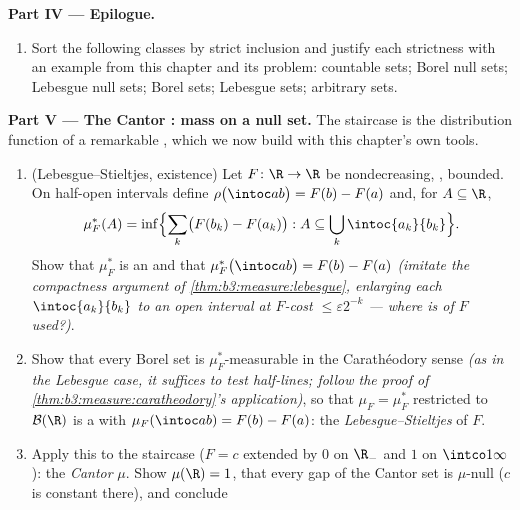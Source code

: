 \begin{problem}
\medskip
\noindent\textbf{Part IV --- Epilogue.}
\begin{enumerate}[resume]
  \item Sort the following classes by strict inclusion and
        justify each strictness with an example from this
        chapter and its problem: countable sets; Borel null
        sets; Lebesgue null sets; Borel sets; Lebesgue sets;
        arbitrary sets.
\end{enumerate}

\medskip
\noindent\textbf{Part V --- The Cantor : mass on a null
set.} The staircase is the distribution function of a
remarkable , which we now build with this chapter's own
tools.
\begin{enumerate}[resume]
  \item (Lebesgue--Stieltjes, existence) Let $F\colon\R\to\R$
        be nondecreasing, , bounded. On half-open
        intervals define $\rho\bigl(\intoc ab\bigr) = F(b) -
        F(a)$ and, for $A \subseteq \R$,
        \[
        \mu_F^*(A) = \inf\Bigl\{\sum_k\bigl(F(b_k) -
        F(a_k)\bigr) : A \subseteq
        \bigcup_k\intoc{a_k}{b_k}\Bigr\} .
        \]
        Show that $\mu_F^*$ is an  and that
        $\mu_F^*\bigl(\intoc ab\bigr) = F(b) - F(a)$
        \emph{(imitate the compactness argument of
        \cref{thm:b3:measure:lebesgue}, enlarging each
        $\intoc{a_k}{b_k}$ to an open interval at
        $F$-cost $\leq \varepsilon2^{-k}$ --- where is
         of $F$ used?)}.
  \item Show that every Borel set is
        $\mu_F^*$-measurable in the Carath\'eodory sense
        \emph{(as in the Lebesgue case, it suffices to test
        half-lines; follow the proof of
        \cref{thm:b3:measure:caratheodory}'s application)}, so
        that $\mu_F = \mu_F^*$ restricted to $\mathcal B(\R)$
        is a  with $\mu_F(\intoc ab) = F(b) - F(a)$:
        the \emph{Lebesgue--Stieltjes } of $F$.
  \item Apply this to the staircase ($F = c$ extended by $0$
        on $\R_-$ and $1$ on $\intco1\infty$): the
        \emph{Cantor } $\mu$. Show $\mu(\R) = 1$, that
        every gap of the Cantor set is $\mu$-null ($c$ is
        constant there), and conclude

\end{enumerate}
\end{problem}
